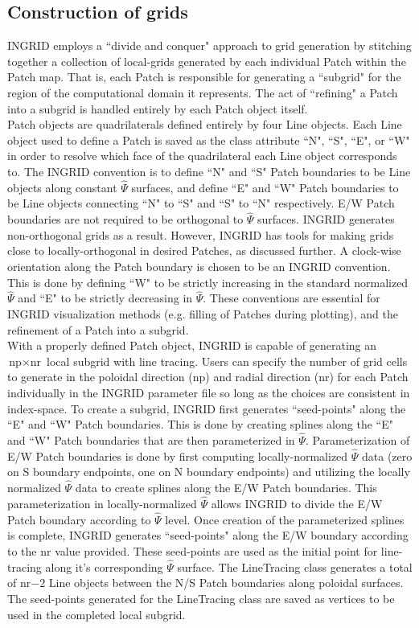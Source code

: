 \subsection{Construction of grids}
INGRID employs a ``divide and conquer" approach to grid generation by stitching together a collection of local-grids generated by each individual Patch within the Patch map. That is, each Patch is responsible for generating a ``subgrid" for the region of the computational domain it represents. The act of ``refining" a Patch into a subgrid is handled entirely by each Patch object itself.\\
Patch objects are quadrilaterals defined entirely by four Line objects. Each Line object used to define a Patch is saved as the class attribute ``N", ``S", ``E", or ``W" in order to resolve which face of the quadrilateral each Line object corresponds to. The INGRID convention is to define ``N" and ``S" Patch boundaries to be Line objects along constant $\hat{\Psi}$ surfaces, and define ``E" and ``W" Patch boundaries to be Line objects connecting ``N" to ``S" and ``S" to ``N" respectively. E/W Patch boundaries are not required to be orthogonal to $\hat{\Psi}$ surfaces. INGRID generates non-orthogonal grids as a result. However, INGRID has tools for making grids close to locally-orthogonal in desired Patches, as discussed further. A clock-wise orientation along the Patch boundary is chosen to be an INGRID convention. This is done by defining ``W" to be strictly increasing in the standard normalized $\hat{\Psi}$ and ``E" to be strictly decreasing in $\hat{\Psi}$. These conventions are essential for INGRID visualization methods (e.g. filling of Patches during plotting), and the refinement of a Patch into a subgrid.  \\
With a properly defined Patch object, INGRID is capable of generating an $\text{np} \times \text{nr}$ local subgrid with line tracing. Users can specify the number of grid cells to generate in the poloidal direction (np) and radial direction (nr) for each Patch individually in the INGRID parameter file so long as the choices are consistent in index-space. To create a subgrid, INGRID first generates ``seed-points" along the ``E" and ``W" Patch boundaries. This is done by creating splines along the ``E" and ``W" Patch boundaries that are then parameterized in $\hat{\Psi}$. Parameterization of E/W Patch boundaries is done by first computing locally-normalized $\hat{\Psi}$ data (zero on S boundary endpoints, one on N boundary endpoints) and utilizing the locally normalized $\hat{\Psi}$ data to create splines along the E/W Patch boundaries. This parameterization in locally-normalized $\hat{\Psi}$ allows INGRID to divide the E/W Patch boundary according to $\hat{\Psi}$ level. Once creation of the parameterized splines is complete, INGRID generates ``seed-points" along the E/W boundary according to the nr value provided. These seed-points are used as the initial point for line-tracing along it's corresponding $\hat{\Psi}$ surface. The LineTracing class generates a total of nr$-2$ Line objects between the N/S Patch boundaries along poloidal surfaces. The seed-points generated for the LineTracing class are saved as vertices to be used in the completed local subgrid.\\
